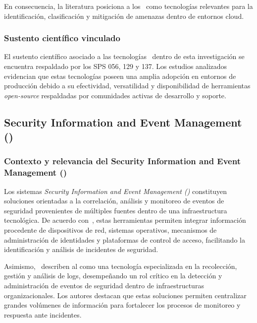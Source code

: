 En consecuencia, la literatura posiciona a los \IDPS\ como tecnologías relevantes para la identificación, clasificación y mitigación de 
amenazas dentro de entornos cloud.

\subsubsection{Sustento científico vinculado}

El sustento científico asociado a las tecnologías \IDPS\ dentro de esta investigación se encuentra respaldado por los SPS 056, 129 y 137. 
Los estudios analizados evidencian que estas tecnologías poseen una amplia adopción en entornos de producción debido a su efectividad, 
versatilidad y disponibilidad de herramientas \textit{open-source} respaldadas por comunidades activas de desarrollo y 
soporte.


\subsection{Security Information and Event Management (\SIEM)}

\subsubsection{Contexto y relevancia del Security Information and Event Management (\SIEM)}

Los sistemas \textit{Security Information and Event Management (\SIEM)} constituyen soluciones orientadas a la correlación, análisis y monitoreo de 
eventos de seguridad provenientes de múltiples fuentes dentro de una infraestructura tecnológica. De acuerdo con~\cite{coppolino2022siem}, 
estas herramientas permiten integrar información procedente de dispositivos de red, sistemas operativos, mecanismos de administración de 
identidades y plataformas de control de acceso, facilitando la identificación y análisis de incidentes de seguridad.

Asimismo,~\cite{hadi2024opensource} describen al \SIEM como una tecnología especializada en la recolección, gestión y análisis de logs, 
desempeñando un rol crítico en la detección y administración de eventos de seguridad dentro de infraestructuras organizacionales. Los 
autores destacan que estas soluciones permiten centralizar grandes volúmenes de información para fortalecer los procesos de monitoreo y 
respuesta ante incidentes.

